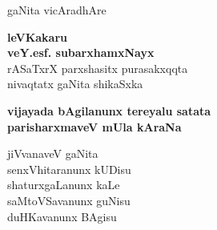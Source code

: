 \thispagestyle{empty}
\begin{center}
{\fontsize{30}{32}\selectfont gaNita vicAradhAre}
\vfill


{\LARGE\bfseries leVKakaru}\\[4pt]
{\large   {\bf veY.esf. subarxhamxNayx}\\[4pt]
   rASaTxrX parxshasitx purasakxqqta\\[4pt]
   nivaqtatx gaNita shikaSxka}

\vfill

{\Large\bfseries   vijayada bAgilanunx tereyalu satata\\
  parisharxmaveV mUla kAraNa}

\vfill

{\Large
  jiVvanaveV gaNita\\
  senxVhitaranunx kUDisu\\
  shaturxgaLanunx kaLe\\
  saMtoVSavanunx guNisu\\
  duHKavanunx BAgisu}

\end{center}
